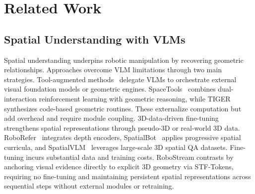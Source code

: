 \section{Related Work}
\label{sec:related_work}

\subsection{Spatial Understanding with VLMs}
Spatial understanding underpins robotic manipulation by recovering geometric relationships. Approaches overcome VLM limitations through two main strategies.
Tool-augmented methods~\cite{ding2024open6dor, qin2025robofactory, zhudexflywheel, tan2025roboos} delegate VLMs to orchestrate external visual foundation models or geometric engines. SpaceTools~\cite{chen2025spacetools} combines dual-interaction reinforcement learning with geometric reasoning, while TIGER~\cite{han2025tiger} synthesizes code-based geometric routines. These externalize computation but add overhead and require module coupling.
3D-data-driven fine-tuning~\cite{cheng2024spatialrgpt, song2025robospatial, daxberger2025mm, raysat, wang2025spatial457} strengthens spatial representations through pseudo-3D or real-world 3D data. RoboRefer~\cite{zhouroborefer} integrates depth encoders, SpatialBot~\cite{cai2025spatialbot} applies progressive spatial curricula, and SpatialVLM~\cite{chen2024spatialvlm} leverages large-scale 3D spatial QA datasets. Fine-tuning incurs substantial data and training costs.
RoboStream contrasts by anchoring visual evidence directly to explicit 3D geometry via STF-Tokens, requiring no fine-tuning and maintaining persistent spatial representations across sequential steps without external modules or retraining.

